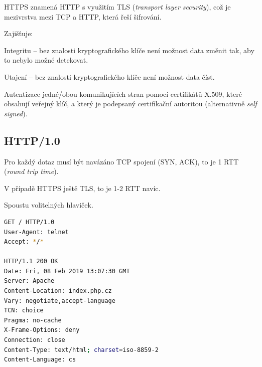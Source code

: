 \begin{compactitem}
    \item HTTPS znamená HTTP s využitím TLS (\textit{transport layer security}), což je mezivrstva mezi TCP a HTTP, která řeší šifrování.

    \item Zajišťuje: \begin{compactitem}
        \item Integritu -- bez znalosti kryptografického klíče není možnost data změnit tak, aby to nebylo možné detekovat.
        \item Utajení -- bez znalosti kryptografického klíče není možnost data číst.
    \end{compactitem}

    \item Autentizace jedné/obou komunikujících stran pomocí certifikátů X.509, které obsahují veřejný klíč, a který je podepsaný certifikační autoritou (alternativně \textit{self signed}).
\end{compactitem}

\subsection{HTTP/1.0}

\begin{compactitem}
    \item Pro každý dotaz musí být navázáno TCP spojení (SYN, ACK), to je 1 RTT (\textit{round trip time}). \begin{compactitem}
        \item  V případě HTTPS ještě TLS, to je 1-2 RTT navíc.
    \end{compactitem}

    \item Spoustu volitelných hlaviček.
\end{compactitem}

\noindent\begin{minipage}{\linewidth}
    \begin{lstlisting}[language=bash, caption={Příklad HTTP/1.0 komunikace.}]
GET / HTTP/1.0
User-Agent: telnet
Accept: */*

HTTP/1.1 200 OK
Date: Fri, 08 Feb 2019 13:07:30 GMT
Server: Apache
Content-Location: index.php.cz
Vary: negotiate,accept-language
TCN: choice
Pragma: no-cache
X-Frame-Options: deny
Connection: close
Content-Type: text/html; charset=iso-8859-2
Content-Language: cs
\end{lstlisting}
\end{minipage}

